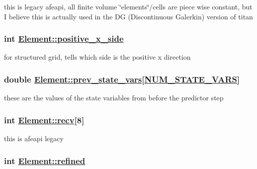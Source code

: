 this is legacy afeapi, all finite volume \char`\"{}elements\char`\"{}/cells are piece wise constant, but I believe this is actually used in the DG (Discontinuous Galerkin) version of titan 

\hypertarget{classElement_r33}{
\subsubsection[positive\_\-x\_\-side]{\setlength{\rightskip}{0pt plus 5cm}int \hyperlink{classElement_r33}{Element::positive\_\-x\_\-side}}}
\label{classElement_r33}


for structured grid, tells which side is the positive x direction 

\hypertarget{classElement_r29}{
\subsubsection[prev\_\-state\_\-vars]{\setlength{\rightskip}{0pt plus 5cm}double \hyperlink{classElement_r29}{Element::prev\_\-state\_\-vars}\mbox{[}\hyperlink{constant_8h_a45}{NUM\_\-STATE\_\-VARS}\mbox{]}}}
\label{classElement_r29}


these are the values of the state variables from before the predictor step 

\hypertarget{classElement_r27}{
\subsubsection[recv]{\setlength{\rightskip}{0pt plus 5cm}int \hyperlink{classElement_r27}{Element::recv}\mbox{[}8\mbox{]}}}
\label{classElement_r27}


this is afeapi legacy 

\hypertarget{classElement_r19}{
\subsubsection[refined]{\setlength{\rightskip}{0pt plus 5cm}int \hyperlink{classElement_r19}{Element::refined}}}
\label{classElement_r19}



